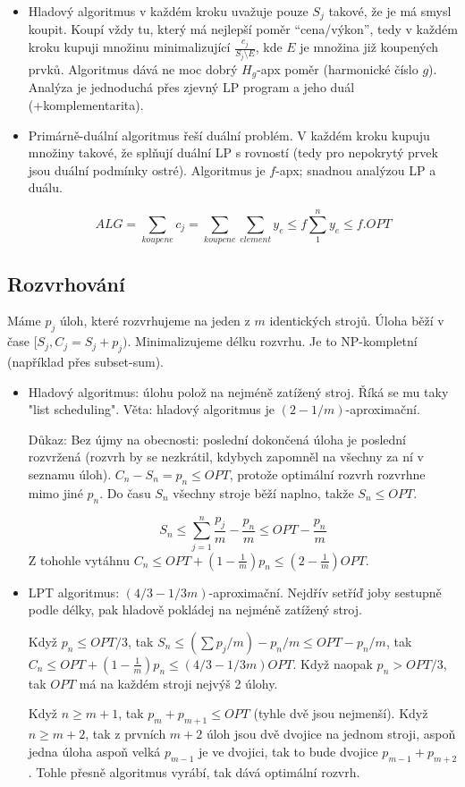 \documentclass[a4paper,10pt,titlepage]{article} \usepackage[utf8]{inputenc}
\begin{document}
\begin{itemize}
\item	Hladový algoritmus v každém kroku uvažuje pouze $S_j$ takové, že je má smysl koupit.
	Koupí vždy tu, který má nejlepší poměr ``cena/výkon'', tedy v každém kroku kupuji
	množinu minimalizující $\frac{c_j}{S_j \setminus E}$, kde $E$ je množina již koupených
	prvků. Algoritmus dává ne moc dobrý $H_g$-apx poměr (harmonické číslo $g$).
	Analýza je jednoduchá přes zjevný LP program a jeho duál (+komplementarita).

\item	Primárně-duální algoritmus řeší duální problém. V každém kroku kupuju množiny takové,
	že splňují duální LP s rovností (tedy pro nepokrytý prvek jsou duální podmínky
	ostré). Algoritmus je $f$-apx; snadnou analýzou LP a duálu.

	$$
	ALG = \sum\limits_{koupene} c_j = \sum\limits_{koupene}\sum\limits_{element} y_e \leq f \sum\limits_{1}^{n} y_e \leq f.OPT
	$$
\end{itemize}

\subsection{Rozvrhování}
Máme $p_j$ úloh, které rozvrhujeme na jeden z $m$ identických strojů.
Úloha běží v čase $[S_j, C_j=S_j+p_j)$. Minimalizujeme délku rozvrhu.
Je to NP-kompletní (například přes subset-sum).

\begin{itemize}
\item Hladový algoritmus: úlohu polož na nejméně zatížený stroj.
	Říká se mu taky "list scheduling".
	Věta: hladový algoritmus je $(2-1/m)$-aproximační.

	Důkaz:
	Bez újmy na obecnosti: poslední dokončená úloha je poslední rozvržená (rozvrh
	by se nezkrátil, kdybych zapomněl na všechny za ní v seznamu úloh).
	$C_n-S_n=p_n\leq OPT$, protože optimální rozvrh rozvrhne mimo jiné $p_n$.
	Do času $S_n$ všechny stroje běží naplno, takže $S_n\leq OPT$.

	$$S_n\leq \sum_{j=1}^n \frac{p_j}{m} - \frac{p_n}{m}\leq OPT-\frac{p_n}{m}$$
	Z tohohle vytáhnu $C_n\leq OPT+(1-\frac{1}{m})p_n\leq (2-\frac{1}{m})OPT$.
\item LPT algoritmus: $(4/3-1/3m)$-aproximační.
	Nejdřív setříď joby sestupně podle délky, pak hladově pokládej na
	nejméně zatížený stroj.

	Když $p_n\leq OPT/3$, tak $S_n\leq (\sum p_j/m)-p_n/m\leq OPT-p_n/m$,
	tak $C_n\leq OPT+(1-\frac{1}{m})p_n\leq (4/3-1/3m)OPT$.
	Když naopak $p_n>OPT/3$, tak $OPT$ má na každém stroji nejvýš
	2 úlohy.

	Když $n\geq m+1$, tak $p_m+p_{m+1}\leq OPT$ (tyhle dvě jsou nejmenší).
	Když $n\geq m+2$, tak z prvních $m+2$ úloh jsou dvě dvojice na jednom
	stroji, aspoň jedna úloha aspoň velká $p_{m-1}$ je ve dvojici,
	tak to bude dvojice $p_{m-1}+p_{m+2}$. Tohle přesně algoritmus
	vyrábí, tak dává optimální rozvrh.
\end{itemize}
\end{document}

